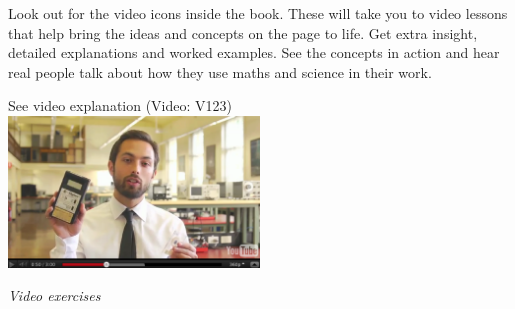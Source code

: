 {\Large

Look out for the video icons inside the book. These will take you to video lessons that help bring the ideas and concepts on the page to life. Get extra insight, detailed explanations and worked examples. See the concepts in action and hear real people talk about how they use maths and science in their work. \par

\begin{center}
See video explanation  (Video: V123)\\
\includegraphics[width=0.5\textwidth]{title_images/veritasiumvideo.eps}
\end{center}\par

}
\vspace{0.5cm}
{\normalfont\sffamily\fontsize{22}\normalfont\itshape Video exercises} \par

